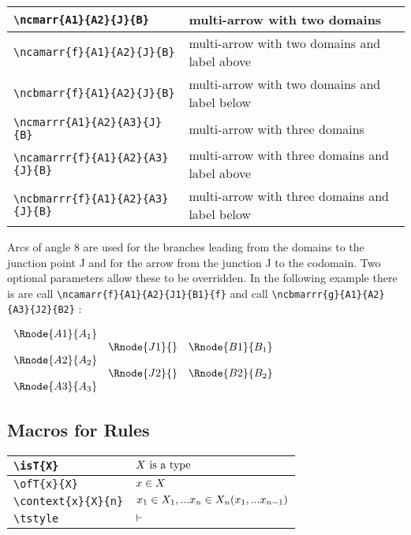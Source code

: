 \documentclass[10pt,a4paper]{article}
\begin{document}
\begin{table}[h]
	\centering
		\begin{tabular}{|l |  p{5cm} | }
		   \hline
		   \verb!\ncmarr{A1}{A2}{J}{B}! & multi-arrow with two domains \\
		    \hline
		   \verb!\ncamarr{f}{A1}{A2}{J}{B}! & multi-arrow with two domains and label above \\
		   \hline
		 	 \verb!\ncbmarr{f}{A1}{A2}{J}{B}! & multi-arrow with two domains and label below \\
		 	 \hline
		 	 \verb!\ncmarrr{A1}{A2}{A3}{J}{B}! & multi-arrow with three domains \\
		 	 \hline
		   \verb!\ncamarrr{f}{A1}{A2}{A3}{J}{B}! & multi-arrow with three domains and label above \\
		   \hline
		 	 \verb!\ncbmarrr{f}{A1}{A2}{A3}{J}{B}! & multi-arrow with three domains and label below \\
		 	 \hline
		\end{tabular}
\end{table}
Arcs of angle 8 are used for the branches leading from the domains to the junction point J and for the arrow from the junction J to the codomain.
Two optional parameters allow these to be overridden.
In the following example there is are call \verb!\ncamarr{f}{A1}{A2}{J1}{B1}{f}! and call
\verb!\ncbmarrr{g}{A1}{A2}{A3}{J2}{B2}! :
\setlength{\arraycolsep}{1cm}
\begin{center}
$
\begin{array}{cccc}
\Rnode{A1}{A_1}& & \\
                & \Rnode{J1}{}& \Rnode{B1}{B_1} \\
\Rnode{A2}{A_2}& & \\
                &  \Rnode{J2}{}& \Rnode{B2}{B_2} \\
\Rnode{A3}{A_3}& & \\
\end{array}
$

\end{center}
\setlength{\arraycolsep}{.2cm}

\subsection{Macros for Rules}

\begin{table}[h]
	\centering
\begin{tabular}{| l | l |}
 \hline
 \verb!\isT{X}!            &   $X\mbox{ is a type}$        \\
 \hline
 \verb!\ofT{x}{X}!         &   $x \in X$     \\
 \hline
 \verb!\context{x}{X}{n}!     &   $x_1 \in X_1,... x_{n} \in X_{n}(x_1,...x_{n-1})$ \\
 \hline
 \verb!\tstyle!               &   $\vdash$ \\
 \hline
\end{tabular}
\end{table}
\end{document}
